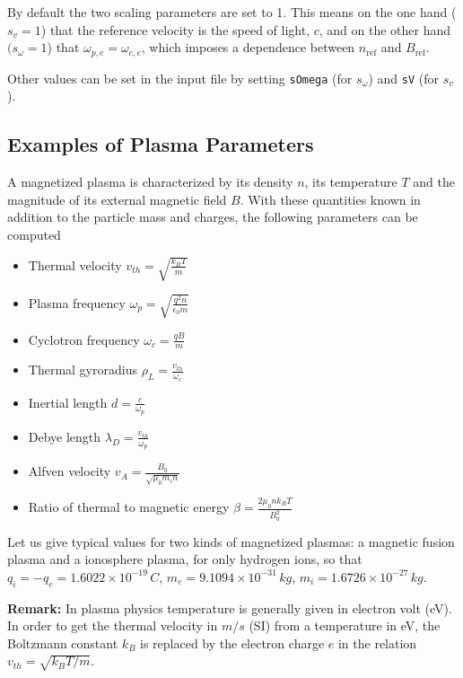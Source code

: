 \documentclass[english]{article}
\newcommand{\nr}{n_{\mathrm{ref}}}
\newcommand{\Br}{B_{\mathrm{ref}}}
\begin{document}
By default the two scaling parameters are set to 1. This means on the one hand ($s_v=1$) that the reference velocity is the speed of light, $c$, and on the other hand $(s_\omega=1$) that $\omega_{p,e}=\omega_{c,e}$, which imposes a dependence between $\nr$ and $\Br$.

Other values can be set in the input file by setting
\verb|sOmega| (for $s_\omega$) and \verb|sV| (for $s_v$).

\subsection{Examples of Plasma Parameters}

A magnetized plasma is characterized by its density $n$, its temperature $T$ and the magnitude of its external magnetic field $B$. With these quantities known in addition to the particle mass and charges, the following parameters can be computed

\begin{itemize}
	\item Thermal velocity $v_{th}= \sqrt{\frac{k_B T}{m}}$
	\item Plasma frequency $\omega_p = \sqrt{\frac{q^2 n}{\epsilon_0 m}}$
	\item Cyclotron frequency  $\omega_c = \frac{q B}{m}$
	\item Thermal gyroradius $\rho_L = \frac{v_{th}}{\omega_c}$
	\item Inertial length $d=\frac{c}{\omega_p}$
	\item Debye length $\lambda_D = \frac{v_{th}}{\omega_p}$
	\item Alfven velocity $v_A = \frac{B_0}{\sqrt{\mu_0 m_i n}}$
	\item Ratio of thermal to magnetic energy $\beta = \frac{2\mu_0 n k_B T}{B_0^2}$
\end{itemize}

Let us give typical values for two kinds of magnetized plasmas: a magnetic fusion plasma and a ionosphere plasma, for only hydrogen ions, so that $q_i = -q_e = 1.6022\times 10^{-19} \,C$, $m_e =  9.1094 \times 10^{-31} \,kg$, $m_i=1.6726 \times 10^{-27}\,kg$.

\textbf{Remark:}
In plasma physics temperature is generally given in electron volt (eV). In order to get the thermal velocity in $m/s$ (SI) from a temperature in eV, the Boltzmann constant $k_B$ is replaced by the electron charge $e$ in the relation
$v_{th}= \sqrt{k_B T / m}$.
\end{document}
